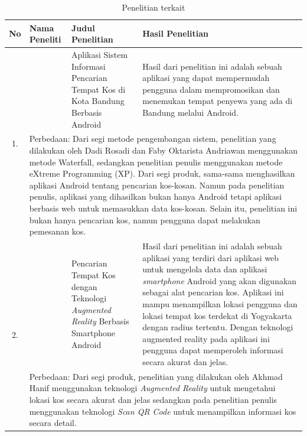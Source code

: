 \begin{longtable}{ |c|p{3cm}|p{4cm}|p{5cm}| }
	\caption{Penelitian terkait}
	\label{penelitian} \\
		\hline
		No & Nama Peneliti & Judul Penelitian & Hasil Penelitian \\ \hline
		\multirow{2}{*}{1.} & \citep{dadi2016} & Aplikasi Sistem Informasi Pencarian Tempat Kos di Kota Bandung Berbasis Android & Hasil dari penelitian ini adalah sebuah aplikasi yang dapat mempermudah pengguna dalam mempromosikan dan menemukan tempat penyewa yang ada di Bandung melalui Android.\\ \cline{2-4}
		& \multicolumn{3}{|p{13cm}|}{Perbedaan: Dari segi metode pengembangan sistem, penelitian yang dilakukan oleh Dadi Rosadi dan Faby Oktarista Andriawan menggunakan metode Waterfall, sedangkan penelitian penulis menggunakan metode eXtreme Programming (XP). Dari segi produk, sama-sama menghasilkan aplikasi Android tentang pencarian kos-kosan. Namun pada penelitian penulis, aplikasi yang dihasilkan bukan hanya Android tetapi aplikasi berbasis web untuk memasukkan data kos-kosan. Selain itu, penelitian ini bukan hanya pencarian kos, namun pengguna dapat melakukan pemesanan kos.} \\ \hline
		\multirow{2}{*}{2.} & \citep{hanif2013} & Pencarian Tempat Kos dengan Teknologi \textit{Augmented Reality} Berbasis Smartphone Android & Hasil dari penelitian ini adalah sebuah aplikasi yang terdiri dari aplikasi web untuk mengelola data dan aplikasi \textit{smartphone} Android yang akan digunakan sebagai alat pencarian kos. Aplikasi ini mampu menampilkan lokasi pengguna dan lokasi tempat kos terdekat di Yogyakarta dengan radius tertentu. Dengan teknologi augmented reality pada aplikasi ini pengguna dapat memperoleh informasi secara akurat dan jelas.\\ \cline{2-4}
		& \multicolumn{3}{|p{13cm}|}{Perbedaan: Dari segi produk, penelitian yang dilakukan oleh Akhmad Hanif menggunakan teknologi \textit{Augmented Reality} untuk mengetahui lokasi kos secara akurat dan jelas sedangkan pada penelitian penulis menggunakan teknologi \textit{Scan QR Code} untuk menampilkan informasi kos secara detail.} \\ \hline
\end{longtable}

